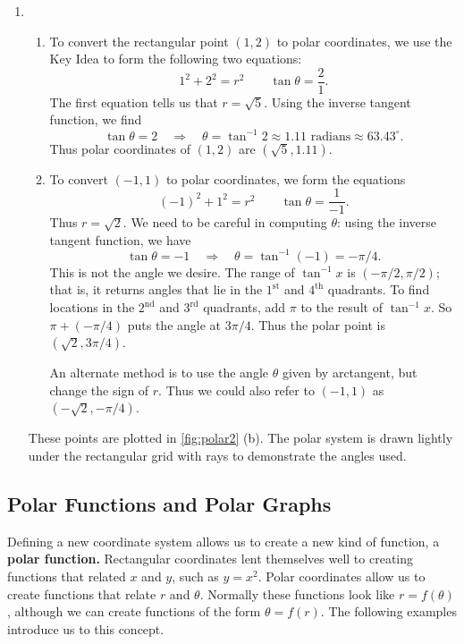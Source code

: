 \begin{example}
\begin{enumerate}
	\item \begin{enumerate}
		\item To convert the rectangular point $(1,2)$ to polar coordinates, we use the Key Idea to form the following two equations:
		\[1^2+2^2 = r^2 \qquad \tan \theta = \frac{2}{1}.\]
		The first equation tells us that $r=\sqrt{5}$. Using the inverse tangent function, we find
		\[\tan \theta = 2 \quad \Rightarrow \quad \theta = \tan^{-1} 2 \approx 1.11\text{ radians}\approx 63.43^\circ.\]
		Thus polar coordinates of $(1,2)$ are $(\sqrt{5},1.11)$.
		\item		To convert $(-1,1)$ to polar coordinates, we form the equations 
		\[(-1)^2+1^2=r^2 \qquad \tan \theta = \frac{1}{-1}.\]
		Thus $r=\sqrt{2}$. We need to be careful in computing $\theta$: using the inverse tangent function, we have
		\[\tan\theta = -1 \quad \Rightarrow \quad \theta = \tan^{-1}(-1) = -\pi/4.\]
		This is not the angle we desire. The range of $\tan^{-1}x $ is $(-\pi/2,\pi/2)$; that is, it returns angles that lie in the $1^\text{st}$ and $4^\text{th}$ quadrants. To find locations in the $2^\text{nd}$  and $3^\text{rd}$ quadrants, add $\pi$ to the result of $\tan^{-1}x$. So  $\pi+(-\pi/4)$ puts the angle at $3\pi/4$. Thus the polar point is $(\sqrt{2},3\pi/4)$.
		
		An alternate method is to use the angle $\theta$ given by arctangent, but change the sign of $r$. Thus we could also refer to $(-1,1)$ as\\ $(-\sqrt{2},-\pi/4)$.
	\end{enumerate}
These points are plotted in \autoref{fig:polar2} (b). The polar system is drawn lightly under the rectangular grid with rays to demonstrate the angles used.
\end{enumerate}
\end{example}

\subsection{Polar Functions and Polar Graphs}

Defining a new coordinate system allows us to create a new kind of function, a \textbf{polar function.} Rectangular coordinates lent themselves well to creating functions that related $x$ and $y$, such as $y=x^2.$ Polar coordinates allow us to create functions that relate $r$ and $\theta$. Normally these functions look like $r=f(\theta)$, although we can create functions of the form $\theta = f(r)$. The following examples introduce us to this concept.

